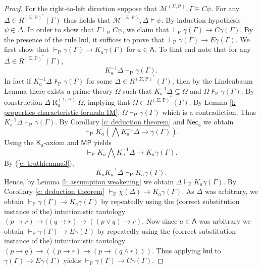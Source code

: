 \documentclass[10pt,a4paper]{amsart}
\newcommand\A{\mathsf{A}}
\newcommand\C {C}
\newcommand{\E}{E}
\newcommand{\K}{K}
\newcommand{\Rel}{\mathrel{R}}
\newcommand{\agi}{a}
\newcommand{\fw}{\mathcal{M}}
\newcommand{\hickp}{\mathrm{P}}
\begin{document}
\begin{proof}
     For the right-to-left direction suppose that $\fw^{(\Sigma, \hickp)}, \Gamma \models \C \psi$. For any $\Delta \in R^{(\Sigma, \hickp)^*}(\Gamma)$ thus holds that $\fw^{(\Sigma, \hickp)}, \Delta \models \psi$. By induction hypothesis $\psi \in \Delta$. In order to show that $\Gamma \vdash_\mathrm{P} \C \psi$, we claim that $\vdash_\mathrm{P} \gamma(\Gamma) \rightarrow \C \gamma(\Gamma)$. By the presence of the rule $\mathsf{Ind}$, it suffices to prove that $\vdash_\mathrm{P} \gamma(\Gamma) \rightarrow \E \gamma(\Gamma)$. We first show that $\vdash_\mathrm{P} \gamma(\Gamma) \rightarrow \K_\agi \gamma(\Gamma)$ for $\agi \in \A$. To that end note that for any $\Delta \in R^{(\Sigma, \hickp)^*}(\Gamma)$,
        \begin{equation*}
            \K_\agi^{-1} \Delta \vdash_\mathrm{P} \gamma(\Gamma).
        \end{equation*}
        In fact if $ \K_\agi^{-1} \Delta \not \vdash_\mathrm{P} \gamma(\Gamma)$ for some $\Delta \in R^{(\Sigma, \hickp)^*}(\Gamma)$, then by the Lindenbaum Lemma there exists a prime theory $\Omega$ such that $\K_\agi^{-1}\Delta \subseteq \Omega$ and $\Omega \not \vdash_\mathrm{P} \gamma(\Gamma)$. By construction $\Delta \Rel_\agi^{(\Sigma, \hickp)} \Omega$, implying that $\Omega \in R^{(\Sigma, \hickp)^*}(\Gamma)$. By Lemma \ref{l: properties characteristic formula IM}, $\Omega \vdash_\mathrm{P} \gamma(\Gamma)$ which is a contradiction. Thus $\K_\agi^{-1} \Delta \vdash_\mathrm{P} \gamma(\Gamma)$. By Corollary \ref{c: deduction theorem} and $\mathsf{Nec_\agi}$ we obtain
        \begin{equation*}
            \vdash_\mathrm{P} \K_\agi (\bigwedge \K_\agi^{-1} \Delta \rightarrow \gamma(\Gamma)).
        \end{equation*}
    Using the $\mathsf{K_\agi}$-axiom and $\mathsf{MP}$ yields
    \begin{equation*}
        \vdash_\mathrm{P} \K_\agi \bigwedge \K_\agi^{-1} \Delta \rightarrow \K_\agi \gamma(\Gamma).
    \end{equation*}
    By (\ref{e: truthlemma3}),
    \begin{equation*}
        \K_\agi \K_\agi^{-1} \Delta \vdash_\mathrm{P} \K_\agi \gamma(\Gamma).
    \end{equation*}
    Hence, by Lemma \ref{l: assumption weakening} we obtain $\Delta \vdash_\mathrm{P} \K_\agi \gamma(\Gamma)$. By Corollary \ref{c: deduction theorem} $\vdash_\mathrm{P} \chi(\Delta) \rightarrow \K_\agi \gamma(\Gamma)$. As $\Delta$ was arbitrary, we obtain $\vdash_\mathrm{P} \gamma(\Gamma) \rightarrow \K_\agi \gamma(\Gamma)$ by repeatedly using the (correct substitution instance of the) intuitionistic tautology $(p \rightarrow r) \rightarrow ((q \rightarrow r) \rightarrow ((p \vee q) \rightarrow r)$. Now since $\agi \in \A$ was arbitrary we obtain $\vdash_\mathrm{P} \gamma(\Gamma) \rightarrow \E \gamma(\Gamma)$ by repeatedly using the (correct substitution instance of the) intuitionistic tautology $(p \rightarrow q) \rightarrow ((p \rightarrow r) \rightarrow (p \rightarrow (q \wedge r)))$. Thus applying $\mathsf{Ind}$ to $\gamma(\Gamma) \rightarrow \E \gamma(\Gamma)$ yields $\vdash_\mathrm{P} \gamma(\Gamma) \rightarrow \C \gamma(\Gamma)$. \smallskip
    

\end{proof}
\end{document}
